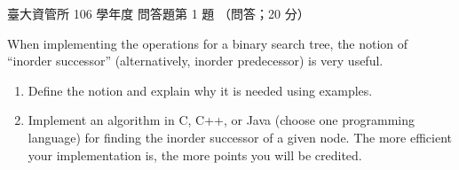 \begin{pastexam}[label={px:ntu-106-im-it-01}]{臺大資管所 106 學年度 問答題第 1 題}
（問答；20 分）

When implementing the operations for a binary search tree, the notion of ``inorder successor''
(alternatively, inorder predecessor) is very useful.
\begin{enumerate}[label=(\alph*)]
\item Define the notion and explain why it is needed using examples.
\item Implement an algorithm in C, C++, or Java (choose one programming language) for finding the
inorder successor of a given node. The more efficient your implementation is, the more points you
will be credited.
\end{enumerate}
\end{pastexam}

